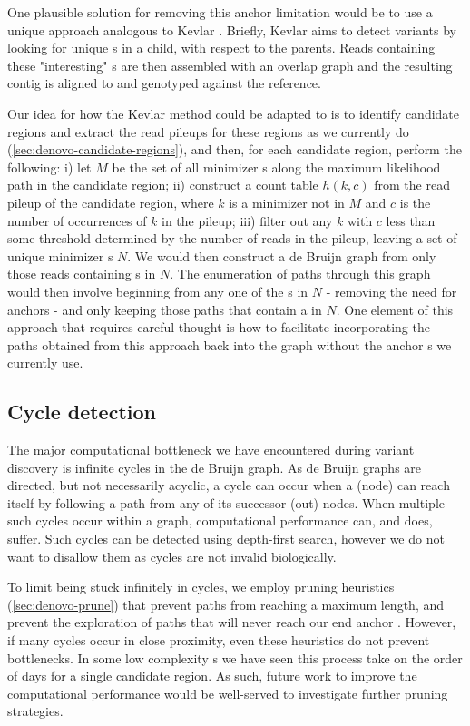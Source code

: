 One plausible solution for removing this anchor \kmer{} limitation would be to use a unique \kmer{} approach analogous to Kevlar \cite{Standage2019}. Briefly, Kevlar aims to detect \denovo{} variants by looking for unique \kmer{}s in a child, with respect to the parents. Reads containing these "interesting" \kmer{}s are then assembled with an overlap graph and the resulting contig is aligned to and genotyped against the reference.

Our idea for how the Kevlar method could be adapted to \pandora{} is to identify candidate regions and extract the read pileups for these regions as we currently do (\autoref{sec:denovo-candidate-regions}), and then, for each candidate region, perform the following: i) let $M$ be the set of all minimizer \kmer{}s along the maximum likelihood path in the candidate region; ii) construct a \kmer{} count table $h(k,c)$ from the read pileup of the candidate region, where $k$ is a minimizer \kmer{} not in $M$ and $c$ is the number of occurrences of $k$ in the pileup; iii) filter out any $k$ with $c$ less than some threshold determined by the number of reads in the pileup, leaving a set of unique minimizer \kmer{}s $N$. We would then construct a de Bruijn graph from only those reads containing \kmer{}s in $N$. The enumeration of paths through this graph would then involve beginning from any one of the \kmer{}s in $N$ - removing the need for anchors - and only keeping those paths that contain a \kmer{} in $N$. One element of this approach that requires careful thought is how to facilitate incorporating the paths obtained from this approach back into the graph without the anchor \kmer{}s we currently use.

\subsection{Cycle detection}
\label{sec:denovo-cycles}
The major computational bottleneck we have encountered during \denovo{} variant discovery is infinite cycles in the de Bruijn graph. As de Bruijn graphs are directed, but not necessarily acyclic, a cycle can occur when a \kmer{} (node) can reach itself by following a path from any of its successor (out) nodes. When multiple such cycles occur within a graph, computational performance can, and does, suffer. Such cycles can be detected using depth-first search, however we do not want to disallow them as cycles are not invalid biologically. 

To limit being stuck infinitely in cycles, we employ pruning heuristics (\autoref{sec:denovo-prune}) that prevent paths from reaching a maximum length, and prevent the exploration of paths that will never reach our end anchor \kmer{}. However, if many cycles occur in close proximity, even these heuristics do not prevent bottlenecks. In some low complexity \prg{}s we have seen this process take on the order of days for a single candidate region. As such, future work to improve the computational performance would be well-served to investigate further pruning strategies. 

